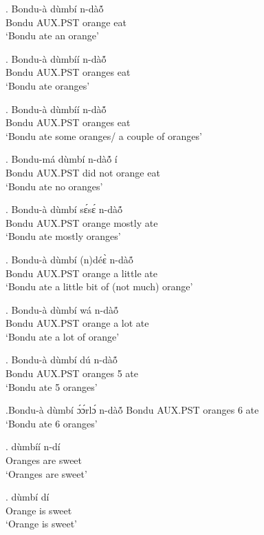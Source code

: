 \documentclass{assets/fieldnotes}
\begin{document}
{\exg. Bondu-à dùmbí n-dàó̃ \\
Bondu AUX.PST orange eat\\
`Bondu ate an orange'

\exg. Bondu-à dùmbíí n-dàó̃ \\
Bondu AUX.PST oranges eat\\
`Bondu ate oranges'


\exg. Bondu-à dùmbíí n-dàó̃ \\
Bondu AUX.PST oranges eat\\
`Bondu ate some oranges/ a couple of oranges'

\exg. Bondu-má dùmbí n-dàó̃ í\\
Bondu AUX.PST did not orange eat\\
`Bondu ate no oranges' 


\exg. Bondu-à dùmbí sɛ́sɛ́ n-dàó̃ \\
Bondu AUX.PST orange mostly ate\\
`Bondu ate mostly oranges'

\exg. Bondu-à dùmbí (n)déɛ̀ n-dàó̃ \\
Bondu AUX.PST orange a little ate\\
`Bondu ate a little bit of (not much) orange'

\exg. Bondu-à dùmbí wá n-dàó̃ \\
Bondu AUX.PST orange a lot ate\\
`Bondu ate a lot of orange'


\exg. Bondu-à dùmbí dú n-dàó̃ \\
Bondu AUX.PST oranges 5 ate\\
`Bondu ate 5 oranges'

\exg.Bondu-à dùmbí ɔ́ɔ́rlɔ́ n-dàó̃ 
Bondu AUX.PST oranges 6 ate\\
`Bondu ate 6 oranges'

\exg. dùmbíí n-dí\\
Oranges are sweet\\
`Oranges are sweet'

\exg. dùmbí dí\\
Orange is sweet\\
`Orange is sweet'

}
\end{document}
